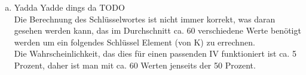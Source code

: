 \documentclass[12pt.twoside,a4paper,notitlepage]{article}
\begin{document}
\begin{enumerate}[a)]
\item Yadda Yadde dings da TODO\\

Die Berechnung des Schlüsselwortes ist nicht immer korrekt, was daran gesehen werden kann, das im Durchschnitt ca. 60
verschiedene Werte benötigt werden um ein folgendes Schlüssel Element (von K) zu errechnen.\\
Die Wahrscheinlichkeit, das dies für einen passenden IV funktioniert ist ca. 5 Prozent, daher ist man mit ca. 60 Werten jenseits der 50 Prozent.\\

\end{enumerate}
\end{document}
